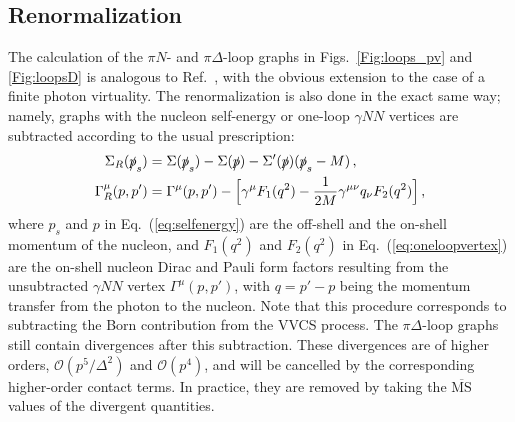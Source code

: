 \documentclass[11pt,preprint,tightenlines,
showpacs,preprintnumbers,amsmath,amssymb,superscriptaddress,a4paper,nofootinbib]{revtex4-1}
\def\eqlab#1{\label{eq:#1}}
\def\Eqref#1{Eq.~(\ref{eq:#1})}
\begin{document}

\subsection{Renormalization}

The calculation of the $\pi N$- and $\pi\Delta$-loop graphs in Figs.~\ref{Fig:loops_pv} and \ref{Fig:loopsD} is analogous to Ref.~\cite{Lensky:2009uv}, with the obvious extension to the case of a finite photon virtuality. The renormalization is also done in the exact same way; 
namely, graphs with the nucleon self-energy
or  one-loop $\gamma NN$ vertices are subtracted according to
the usual prescription:
\begin{align}
\Sigma_R(\slashed{p}_s)&=\Sigma(\slashed{p}_s)-\Sigma(\slashed{p})-\Sigma'(\slashed{p})(\slashed{p}_s-M)\,,\eqlab{selfenergy}\\
\Gamma^\mu_R(p,p')&=\Gamma^\mu(p,p')-\Big[\gamma^\mu F_1(q^2)
-\frac{1}{2M}\gamma^{\mu\nu}q_\nu F_2(q^2)
\Big]\,,\eqlab{oneloopvertex}
\end{align}
where $p_s$ and $p$ in \Eqref{selfenergy} are the off-shell and the on-shell momentum of the nucleon, and
$F_1(q^2)$ and $F_2(q^2)$ in \Eqref{oneloopvertex} are the on-shell nucleon Dirac and Pauli form factors
resulting from the unsubtracted $\gamma NN$ vertex $\Gamma^\mu(p,p')$, with $q=p'-p$
being the momentum transfer from the photon to the nucleon.
Note that this procedure corresponds
to subtracting the Born contribution from the VVCS process.
The $\pi \Delta$-loop graphs
still contain divergences after this subtraction. These divergences are of higher orders, $\mathcal{O}(p^5/\varDelta^2)$ and  $\mathcal{O}(p^4)$,
and will be cancelled by the corresponding higher-order
contact terms. In practice, they are removed by taking the $\overline{\text{MS}}$ values of the divergent quantities.
\end{document}
